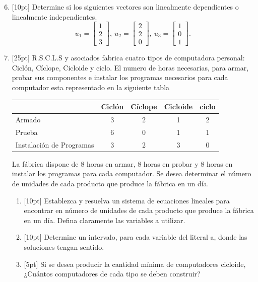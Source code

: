 \documentclass[11pt]{article}
\begin{document}
\begin{enumerate}
\setcounter{enumi}{5}
\item{}[10pt] Determine si los siguientes vectores son linealmente dependientes o linealmente independientes.
\[
u_1 = \begin{bmatrix}1\\2\\3\end{bmatrix},\ u_2 = \begin{bmatrix}2\\2\\0\end{bmatrix},\ u_3 = \begin{bmatrix}1\\0\\1\end{bmatrix}.
\]

\vspace{6cm}

\item{}[25pt] R.S.C.L.S y asociados fabrica cuatro tipos de computadora personal: Ciclón, Cíclope, Cicloide y ciclo. El numero de horas necesarias, para armar, probar sus componentes e instalar los programas necesarios para cada computador esta representado en la siguiente tabla

\vspace{6pt}
\begin{center}
\begin{tabular}{|l|c|c|c|c|}
\hline
 & Ciclón & Cíclope & Cicloide & ciclo \\ \hline
Armado & 3 & 2 & 1 & 2 \\ \hline
Prueba & 6 & 0 & 1 & 1 \\ \hline
Instalación de Programas & 3 & 2 & 3 & 0 \\ \hline
\end{tabular}
\end{center}

\vspace{6pt}
\noindent La fábrica dispone de 8 horas en armar, 8 horas en probar y 8 horas en instalar los programas para cada computador. Se desea determinar el número de unidades de cada producto que produce la fábrica en un día.

\begin{enumerate}
\item{}[10pt] Establezca y resuelva un sistema de ecuaciones lineales para encontrar en número de unidades de cada producto que produce la fábrica en un día. Defina claramente las variables a utilizar.
\item{}[10pt] Determine un intervalo, para cada variable del literal a, donde las soluciones tengan sentido.
\item{}[5pt] Si se desea producir la cantidad mínima de computadores cicloide, ¿Cuántos computadores de cada tipo se deben construir?
\end{enumerate}


\end{enumerate}
\end{document}
